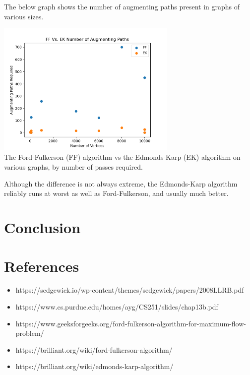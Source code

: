 \documentclass[12pt]{amsart}
\begin{document}
    The below graph shows the number of augmenting paths present
    in graphs of various sizes.

\begin{center}
    \includegraphics[width=0.65\textwidth]{mf_passes_comparison.png} \\
    The Ford-Fulkerson (FF) algorithm vs the Edmonds-Karp (EK)
    algorithm on various graphs, by number of passes required. \\
    \vskip 1cm
\end{center}

    Although the difference is not always extreme, the
    Edmonds-Karp algorithm reliably runs at worst as well as
    Ford-Fulkerson, and usually much better.

\section{Conclusion}

\section{References}

\begin{itemize}
    \item https://sedgewick.io/wp-content/themes/sedgewick/papers/2008LLRB.pdf
    \item https://www.cs.purdue.edu/homes/ayg/CS251/slides/chap13b.pdf
    \item https://www.geeksforgeeks.org/ford-fulkerson-algorithm-for-maximum-flow-problem/
    \item https://brilliant.org/wiki/ford-fulkerson-algorithm/    
    \item https://brilliant.org/wiki/edmonds-karp-algorithm/
\end{itemize}
\end{document}
